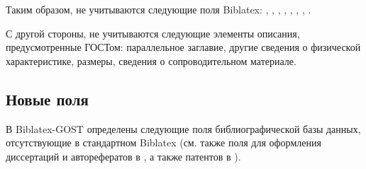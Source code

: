 \documentclass[10pt,a4paper,headings=small,numbers=enddot,english,russian]{ltxdockit}
\newcommand*{\biblatex}{Biblatex\xspace}
\newcommand*{\biblatexgost}{Biblatex-GOST\xspace}
\begin{document}
Таким образом, не учитываются следующие поля \biblatex:
, ,
, , , ,
, .

С другой стороны, не учитываются следующие элементы описания, предусмотренные ГОСТом:
параллельное заглавие, другие сведения о физической характеристике, размеры,
сведения о сопроводительном материале.

\subsection{Новые поля}
\label{sec:newfields}

В \biblatexgost определены следующие
поля библиографической базы данных, отсутствующие в стандартном \biblatex
(см. также поля для оформления диссертаций и авторефератов в ,
а также патентов в ).
\end{document}
